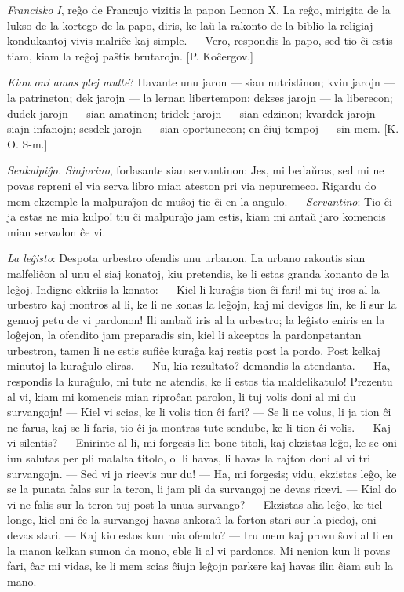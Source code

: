 \emph{Francisko I}, re\^go de Francujo vizitis la papon Leonon X. La
re\^go, mirigita de la lukso de la kortego de la papo, diris, ke
la\u u la rakonto de la biblio la religiaj kondukantoj vivis
malri\^ce kaj simple. --- Vero, respondis la papo, sed tio \^ci
estis tiam, kiam la re\^goj pa\^stis brutarojn. [P. Ko\^cergov.]

\emph{Kion oni amas plej multe}? Havante unu jaron --- sian
nutristinon; kvin jarojn --- la patrineton; dek jarojn --- la lernan
libertempon; dekses jarojn --- la liberecon; dudek jarojn --- sian
amatinon; tridek jarojn --- sian edzinon; kvardek jarojn --- siajn
infanojn; sesdek jarojn --- sian oportunecon; en \^ciuj tempoj ---
sin mem. [K. O. S-m.]

\emph{Senkulpi\^go. Sinjorino}, forlasante sian servantinon: Jes, mi
beda\u uras, sed mi ne povas repreni el via serva libro mian ateston
pri via nepuremeco. Rigardu do mem ekzemple la malpura\^{\j}on de
mu\^soj tie \^ci en la angulo. --- {\sl Servantino}: Tio \^ci ja
estas ne mia kulpo! tiu \^ci malpura\^{\j}o jam estis, kiam mi
anta\u u jaro komencis mian servadon \^ce vi.

\emph{La le\^gisto}: Despota urbestro ofendis unu urbanon. La urbano
rakontis sian malfeli\^con al unu el siaj konatoj, kiu pretendis, ke
li estas granda konanto de la le\^goj. Indigne ekkriis la konato:
--- Kiel li kura\^gis tion \^ci fari! mi tuj iros al la urbestro kaj
montros al li, ke li ne konas la le\^gojn, kaj mi devigos lin, ke li
sur la genuoj petu de vi pardonon! Ili amba\u u iris al la urbestro;
la le\^gisto eniris en la lo\^gejon, la ofendito jam preparadis sin,
kiel li akceptos la pardonpetantan urbestron, tamen li ne estis
sufi\^ce kura\^ga kaj restis post la pordo. Post kelkaj minutoj la
kura\^gulo eliras. --- Nu, kia rezultato? demandis la atendanta. ---
Ha, respondis la kura\^gulo, mi tute ne atendis, ke li estos tia
maldelikatulo! Prezentu al vi, kiam mi komencis mian ripro\^can
parolon, li tuj volis doni al mi du survangojn! --- Kiel vi scias,
ke li volis tion \^ci fari? --- Se li ne volus, li ja tion \^ci ne
farus, kaj se li faris, tio \^ci ja montras tute sendube, ke li tion
\^ci volis. --- Kaj vi silentis? --- Enirinte al li, mi forgesis lin
bone titoli, kaj ekzistas le\^go, ke se oni iun salutas per pli
malalta titolo, ol li havas, li havas la rajton doni al vi tri
survangojn. --- Sed vi ja ricevis nur du! --- Ha, mi forgesis; vidu,
ekzistas le\^go, ke se la punata falas sur la teron, li jam pli da
survangoj ne devas ricevi. --- Kial do vi ne falis sur la teron tuj
post la unua survango? --- Ekzistas alia le\^go, ke tiel longe, kiel
oni \^ce la survangoj havas ankora\u u la forton stari sur la
piedoj, oni devas stari. --- Kaj kio estos kun mia ofendo? --- Iru
mem kaj provu \^sovi al li en la manon kelkan sumon da mono, eble li
al vi pardonos. Mi nenion kun li povas fari, \^car mi vidas, ke li
mem scias \^ciujn le\^gojn parkere kaj havas ilin \^ciam sub la
mano.

